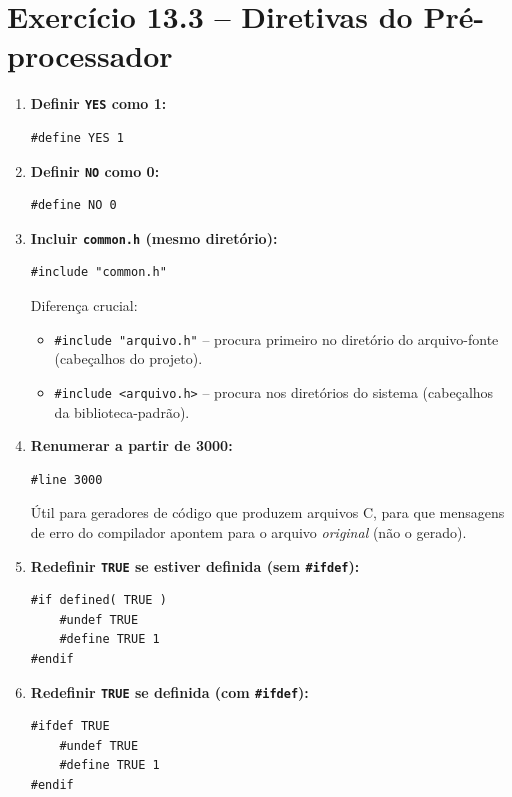 \documentclass[12pt,a4paper]{article}
\begin{document}
\newpage

\section{Exercício 13.3 -- Diretivas do Pré-processador}

\begin{respostabox}
\begin{enumerate}[label=\textbf{\alph*)}]

\item \textbf{Definir \texttt{YES} como 1:}
\begin{lstlisting}
#define YES 1
\end{lstlisting}

\item \textbf{Definir \texttt{NO} como 0:}
\begin{lstlisting}
#define NO 0
\end{lstlisting}

\item \textbf{Incluir \texttt{common.h} (mesmo diretório):}
\begin{lstlisting}
#include "common.h"
\end{lstlisting}
Diferença crucial:
\begin{itemize}[noitemsep]
  \item \texttt{\#include "arquivo.h"} -- procura primeiro no diretório do
  arquivo-fonte (cabeçalhos do projeto).
  \item \texttt{\#include <arquivo.h>} -- procura nos diretórios do sistema
  (cabeçalhos da biblioteca-padrão).
\end{itemize}

\item \textbf{Renumerar a partir de 3000:}
\begin{lstlisting}
#line 3000
\end{lstlisting}
Útil para geradores de código que produzem arquivos C, para que mensagens de
erro do compilador apontem para o arquivo \textit{original} (não o gerado).

\item \textbf{Redefinir \texttt{TRUE} se estiver definida (sem \texttt{\#ifdef}):}
\begin{lstlisting}
#if defined( TRUE )
    #undef TRUE
    #define TRUE 1
#endif
\end{lstlisting}

\item \textbf{Redefinir \texttt{TRUE} se definida (com \texttt{\#ifdef}):}
\begin{lstlisting}
#ifdef TRUE
    #undef TRUE
    #define TRUE 1
#endif
\end{lstlisting}


\end{enumerate}
\end{respostabox}
\end{document}

